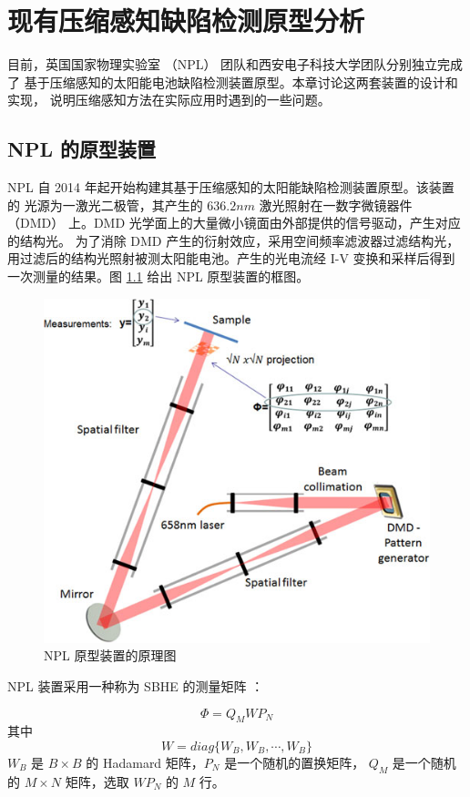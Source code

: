 \chapter{现有压缩感知缺陷检测原型分析}

目前，英国国家物理实验室 （NPL） 团队和西安电子科技大学团队分别独立完成了
基于压缩感知的太阳能电池缺陷检测装置原型。本章讨论这两套装置的设计和实现，
说明压缩感知方法在实际应用时遇到的一些问题。

\section{NPL 的原型装置}

NPL 自 2014 年起开始构建其基于压缩感知的太阳能缺陷检测装置原型。该装置的
光源为一激光二极管，其产生的 $636.2 nm$ 激光照射在一数字微镜器件 （DMD）
上。DMD 光学面上的大量微小镜面由外部提供的信号驱动，产生对应的结构光。
为了消除 DMD 产生的衍射效应，采用空间频率滤波器过滤结构光，
用过滤后的结构光照射被测太阳能电池。产生的光电流经 I-V
变换和采样后得到一次测量的结果。图 \ref{fig:npl} 给出 NPL 原型装置的框图。

\begin{figure}
\centering
\includegraphics[width=.6\textwidth]{Figure/npl.png}
\caption{NPL 原型装置的原理图}
\label{fig:npl}
\end{figure}

NPL 装置采用一种称为 SBHE 的测量矩阵 \cite{BlockHadamard} ：
\begin{definition}[SBHE 矩阵]
\begin{equation}
\Phi = Q_M W P_N
\end{equation}
其中
\begin{equation}
W = diag\{W_B, W_B, \cdots, W_B\}
\end{equation}
$W_B$ 是 $B \times B$ 的 Hadamard 矩阵，$P_N$ 是一个随机的置换矩阵，
$Q_M$ 是一个随机的 $M \times N$ 矩阵，选取 $W P_N$ 的 $M$ 行。
\end{definition}

